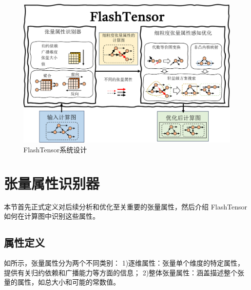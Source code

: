 \begin{figure}[ht]
    \centering
    \includegraphics[width=0.7\linewidth]{figures/flashtensor/overview-crop.pdf}
    \caption{FlashTensor系统设计}
    \label{fig:flashtensor-overview}
\end{figure}



\section{张量属性识别器}
本节首先正式定义对后续分析和优化至关重要的张量属性，然后介绍 FlashTensor 如何在计算图中识别这些属性。



\subsection{属性定义}
如所示，张量属性分为两个不同类别：
1){逐维属性}：张量单个维度的特定属性，提供有关归约依赖和广播能力等方面的信息；
2){整体张量属性}：涵盖描述整个张量的属性，如总大小和可能的常数值。

